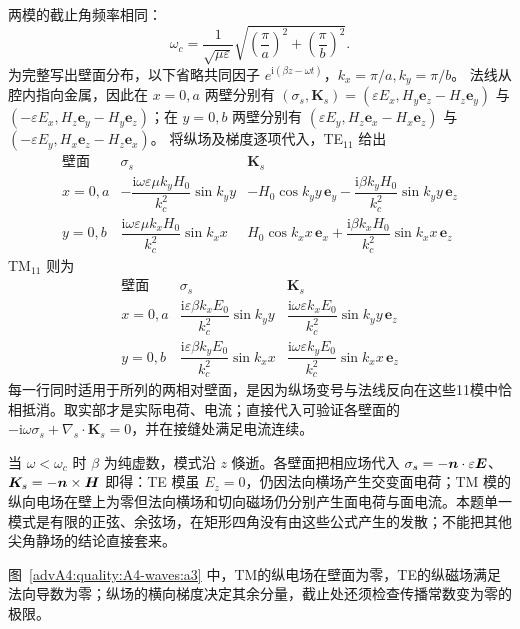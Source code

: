\begin{advsolution}
两模的截止角频率相同：
\[
 \boxed{\omega_c=\frac1{\sqrt{\mu\varepsilon}}
 \sqrt{\left(\frac\pi a\right)^2+
 \left(\frac\pi b\right)^2}}.
\]
为完整写出壁面分布，以下省略共同因子 $e^{\mathrm i(\beta z-\omega t)}$，$k_x=\pi/a,k_y=\pi/b$。
法线从腔内指向金属，因此在 $x=0,a$ 两壁分别有
$(\sigma_s,\boldsymbol K_s)=(\varepsilon E_x,H_y\boldsymbol e_z-H_z\boldsymbol e_y)$ 与
$(-\varepsilon E_x,H_z\boldsymbol e_y-H_y\boldsymbol e_z)$；在 $y=0,b$ 两壁分别有
$(\varepsilon E_y,H_z\boldsymbol e_x-H_x\boldsymbol e_z)$ 与
$(-\varepsilon E_y,H_x\boldsymbol e_z-H_z\boldsymbol e_x)$。
将纵场及梯度逐项代入，TE$_{11}$ 给出
\[
\begin{array}{c|c|l}
\text{壁面}&\sigma_s&\boldsymbol K_s\\\hline
x=0,a&-\dfrac{\mathrm i\omega\varepsilon\mu k_yH_0}{k_c^2}\sin k_yy
&-H_0\cos k_yy\,\boldsymbol e_y
-\dfrac{\mathrm i\beta k_yH_0}{k_c^2}\sin k_yy\,\boldsymbol e_z\\[2mm]
y=0,b&\dfrac{\mathrm i\omega\varepsilon\mu k_xH_0}{k_c^2}\sin k_xx
&H_0\cos k_xx\,\boldsymbol e_x
+\dfrac{\mathrm i\beta k_xH_0}{k_c^2}\sin k_xx\,\boldsymbol e_z
\end{array}
\]
TM$_{11}$ 则为
\[
\begin{array}{c|c|c}
\text{壁面}&\sigma_s&\boldsymbol K_s\\\hline
x=0,a&\dfrac{\mathrm i\varepsilon\beta k_xE_0}{k_c^2}\sin k_yy
&\dfrac{\mathrm i\omega\varepsilon k_xE_0}{k_c^2}\sin k_yy\,\boldsymbol e_z\\[2mm]
y=0,b&\dfrac{\mathrm i\varepsilon\beta k_yE_0}{k_c^2}\sin k_xx
&\dfrac{\mathrm i\omega\varepsilon k_yE_0}{k_c^2}\sin k_xx\,\boldsymbol e_z
\end{array}
\]
每一行同时适用于所列的两相对壁面，是因为纵场变号与法线反向在这些11模中恰相抵消。取实部才是实际电荷、电流；直接代入可验证各壁面的 $-\mathrm i\omega\sigma_s+\nabla_s\cdot\boldsymbol K_s=0$，并在接缝处满足电流连续。

当 $\omega<\omega_c$ 时 $\beta$ 为纯虚数，模式沿 $z$ 倏逝。各壁面把相应场代入
$\sigma_s=-\bm{n}\cdot\varepsilon\bm{E}$、
$\bm{K}_s=-\bm{n}\times\bm{H}$ 即得：TE 模虽 $E_z=0$，仍因法向横场产生交变面电荷；TM 模的纵向电场在壁上为零但法向横场和切向磁场仍分别产生面电荷与面电流。本题单一模式是有限的正弦、余弦场，在矩形四角没有由这些公式产生的发散；不能把其他尖角静场的结论直接套来。

图~\ref{advA4:quality:A4-waves:a3} 中，TM的纵电场在壁面为零，TE的纵磁场满足法向导数为零；纵场的横向梯度决定其余分量，截止处还须检查传播常数变为零的极限。
\end{advsolution}

